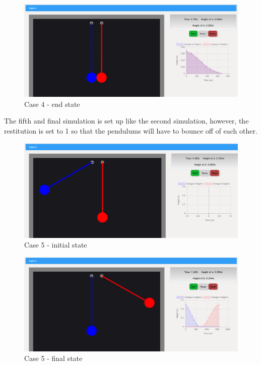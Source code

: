 \documentclass[onecolumn, draftclsnofoot,10pt, compsoc]{IEEEtran}
\begin{document}
\begin{figure}[H]
  \includegraphics[width=5.5 in]{pictures_beta/case4_end.png}
  \caption{Case 4 - end state }
  \label{fig:case4}
\end{figure}

\noindent 
The fifth and final simulation is set up like the second simulation, however, the restitution is set to 1 so that the pendulums will have to bounce off of each other. 

\begin{figure}[H]
  \includegraphics[width=5.5 in]{pictures_beta/case5_start.png}
  \caption{Case 5 - initial state }
  \label{fig:case5}
\end{figure}
\begin{figure}[H]
  \includegraphics[width=5.5 in]{pictures_beta/case5_end.png}
  \caption{Case 5 - final state }
  \label{fig:case5}
\end{figure}
\end{document}
